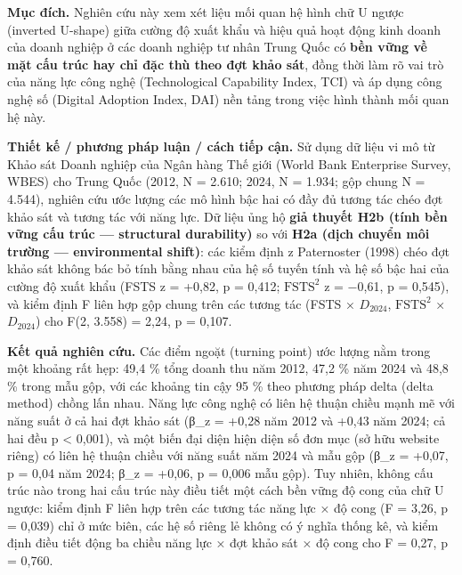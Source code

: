 \documentclass[12pt,a4paper]{article}
\begin{document}
\textbf{Mục đích.} Nghiên cứu này xem xét liệu mối quan hệ hình chữ U
ngược (inverted U-shape) giữa cường độ xuất khẩu và hiệu quả hoạt động
kinh doanh của doanh nghiệp ở các doanh nghiệp tư nhân Trung Quốc có
\textbf{bền vững về mặt cấu trúc hay chỉ đặc thù theo đợt khảo sát},
đồng thời làm rõ vai trò của năng lực công nghệ (Technological
Capability Index, TCI) và áp dụng công nghệ số (Digital Adoption Index,
DAI) nền tảng trong việc hình thành mối quan hệ này.

\textbf{Thiết kế / phương pháp luận / cách tiếp cận.} Sử dụng dữ liệu vi
mô từ Khảo sát Doanh nghiệp của Ngân hàng Thế giới (World Bank
Enterprise Survey, WBES) cho Trung Quốc (2012, N = 2.610; 2024, N =
1.934; gộp chung N = 4.544), nghiên cứu ước lượng các mô hình bậc hai có
đầy đủ tương tác chéo đợt khảo sát và tương tác với năng lực. Dữ liệu
ủng hộ \textbf{giả thuyết H2b (tính bền vững cấu trúc --- structural
durability)} so với \textbf{H2a (dịch chuyển môi trường ---
environmental shift)}: các kiểm định z Paternoster (1998) chéo đợt khảo
sát không bác bỏ tính bằng nhau của hệ số tuyến tính và hệ số bậc hai
của cường độ xuất khẩu (FSTS z = +0,82, p = 0,412; \(\mathrm{FSTS}^2\) z
= −0,61, p = 0,545), và kiểm định F liên hợp gộp chung trên các tương
tác (FSTS × \(D_{2024}\), \(\mathrm{FSTS}^2\) × \(D_{2024}\)) cho F(2,
3.558) = 2,24, p = 0,107.

\textbf{Kết quả nghiên cứu.} Các điểm ngoặt (turning point) ước lượng
nằm trong một khoảng rất hẹp: 49,4 \% tổng doanh thu năm 2012, 47,2 \%
năm 2024 và 48,8 \% trong mẫu gộp, với các khoảng tin cậy 95 \% theo
phương pháp delta (delta method) chồng lấn nhau. Năng lực công nghệ có
liên hệ thuận chiều mạnh mẽ với năng suất ở cả hai đợt khảo sát (β\_z =
+0,28 năm 2012 và +0,43 năm 2024; cả hai đều p \textless{} 0,001), và
một biến đại diện hiện diện số đơn mục (sở hữu website riêng) có liên hệ
thuận chiều với năng suất năm 2024 và mẫu gộp (β\_z = +0,07, p = 0,04
năm 2024; β\_z = +0,06, p = 0,006 mẫu gộp). Tuy nhiên, không cấu trúc
nào trong hai cấu trúc này điều tiết một cách bền vững độ cong của chữ U
ngược: kiểm định F liên hợp trên các tương tác năng lực × độ cong (F =
3,26, p = 0,039) chỉ ở mức biên, các hệ số riêng lẻ không có ý nghĩa
thống kê, và kiểm định điều tiết động ba chiều năng lực × đợt khảo sát ×
độ cong cho F = 0,27, p = 0,760.
\end{document}
